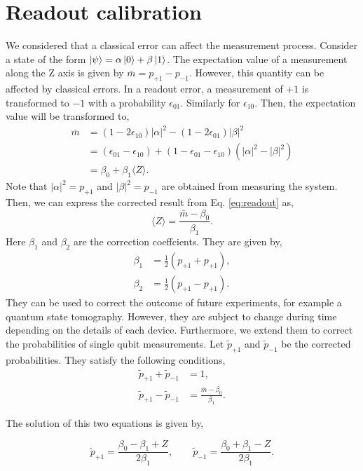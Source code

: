 \section{Readout calibration}
We considered that a classical error can affect the measurement process. Consider a state of the form $\ket{\psi} = \alpha\ket{0}+\beta\ket{1}$. The expectation value of a measurement along the Z axis is given by $\bar{m}=p_{+1}-p_{-1}$. However, this quantity can be affected by classical errors. 
In a readout error, a measurement of $+1$ is transformed to $-1$ with a probability $\epsilon_{01}$. Similarly for $\epsilon_{10}$. Then, the expectation value will be transformed to,
\begin{align}\label{eq:readout}
\bar{m} &= (1-2\epsilon_{10})|\alpha|^2-(1-2\epsilon_{01})|\beta|^2\\
&=(\epsilon_{01}-\epsilon_{10})+(1-\epsilon_{01}-\epsilon_{10})(|\alpha|^2-|\beta|^2)\\
&= \beta_0 + \beta_1 \langle Z\rangle.
\end{align}
Note that $|\alpha|^2=p_{+1}$ and $|\beta|^2=p_{-1}$ are obtained from measuring the system. Then, we can express the corrected result from Eq. \eqref{eq:readout} as,
\begin{equation}
\langle Z\rangle = \frac{\bar{m}-\beta_0}{\beta_1}.
\end{equation}
Here $\beta_1$ and $\beta_2$ are the correction coeffcients. They are given by,
\begin{align}\label{eq:betas}
\beta_1 &= \frac{1}{2} (p_{+1}+p_{+1}),\\
\beta_2 &= \frac{1}{2} (p_{+1}-p_{+1}).
\end{align}
They can be used to correct the outcome of future experiments, for example a quantum state tomography. However, they are subject to change during time depending on the details of each device. Furthermore, we extend them to correct the probabilities of single qubit measurements. Let $\tilde{p}_{+1}$ and $\tilde{p}_{-1}$ be the corrected probabilities. They satisfy the following conditions,
\begin{align}
\tilde{p}_{+1}+\tilde{p}_{-1} &= 1,\\
\tilde{p}_{+1}-\tilde{p}_{-1} & = \frac{\bar{m}-\beta_0}{\beta_1}.
\end{align}

The solution of this two equations is given by,

\begin{equation}\label{eq:corrected_ps}
\tilde{p}_{+1} = \frac{\beta_0 - \beta_1 +Z}{2\beta_1},\qquad \tilde{p}_{-1} = \frac{\beta_0 + \beta_1 -Z}{2\beta_1}.
\end{equation}

